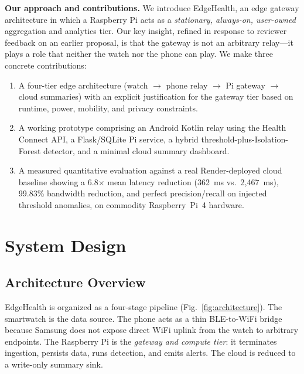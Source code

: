 \documentclass[conference]{IEEEtran}
\begin{document}
\textbf{Our approach and contributions.} We introduce EdgeHealth, an edge gateway architecture in which a Raspberry Pi acts as a \textit{stationary, always-on, user-owned} aggregation and analytics tier. Our key insight, refined in response to reviewer feedback on an earlier proposal, is that the gateway is not an arbitrary relay---it plays a role that neither the watch nor the phone can play. We make three concrete contributions:
\begin{enumerate}
    \item A four-tier edge architecture (watch $\rightarrow$ phone relay $\rightarrow$ Pi gateway $\rightarrow$ cloud summaries) with an explicit justification for the gateway tier based on runtime, power, mobility, and privacy constraints.
    \item A working prototype comprising an Android Kotlin relay using the Health Connect API, a Flask/SQLite Pi service, a hybrid threshold-plus-Isolation-Forest detector, and a minimal cloud summary dashboard.
    \item A measured quantitative evaluation against a real Render-deployed cloud baseline showing a 6.8$\times$ mean latency reduction (362~ms vs.\ 2{,}467~ms), 99.83\% bandwidth reduction, and perfect precision/recall on injected threshold anomalies, on commodity Raspberry~Pi~4 hardware.
\end{enumerate}

\section{System Design}

\subsection{Architecture Overview}

EdgeHealth is organized as a four-stage pipeline (Fig.~\ref{fig:architecture}). The smartwatch is the data source. The phone acts as a thin BLE-to-WiFi bridge because Samsung does not expose direct WiFi uplink from the watch to arbitrary endpoints. The Raspberry Pi is the \textit{gateway and compute tier}: it terminates ingestion, persists data, runs detection, and emits alerts. The cloud is reduced to a write-only summary sink.
\end{document}

